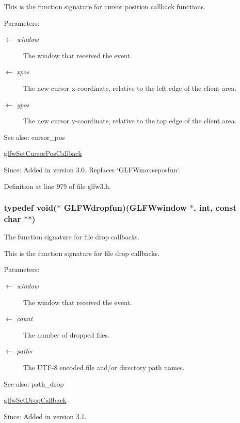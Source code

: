 This is the function signature for cursor position callback functions.

\begin{Desc}
\item[Parameters:]
\begin{description}
\item[\mbox{$\leftarrow$} {\em window}]The window that received the event. \item[\mbox{$\leftarrow$} {\em xpos}]The new cursor x-coordinate, relative to the left edge of the client area. \item[\mbox{$\leftarrow$} {\em ypos}]The new cursor y-coordinate, relative to the top edge of the client area.\end{description}
\end{Desc}
\begin{Desc}
\item[See also:]cursor\_\-pos 

\hyperlink{group__input_g9c49c0d3d3c775c3124726f1d902124d}{glfwSetCursorPosCallback}\end{Desc}
\begin{Desc}
\item[Since:]Added in version 3.0. Replaces `GLFWmouseposfun`. \end{Desc}


Definition at line 979 of file glfw3.h.\hypertarget{group__input_gcc95e259ad21d4f666faa6280d4018fd}{
\subsubsection[GLFWdropfun]{\setlength{\rightskip}{0pt plus 5cm}typedef void($\ast$  {\bf GLFWdropfun})({\bf GLFWwindow} $\ast$, int, const char $\ast$$\ast$)}}
\label{group__input_gcc95e259ad21d4f666faa6280d4018fd}


The function signature for file drop callbacks. 

This is the function signature for file drop callbacks.

\begin{Desc}
\item[Parameters:]
\begin{description}
\item[\mbox{$\leftarrow$} {\em window}]The window that received the event. \item[\mbox{$\leftarrow$} {\em count}]The number of dropped files. \item[\mbox{$\leftarrow$} {\em paths}]The UTF-8 encoded file and/or directory path names.\end{description}
\end{Desc}
\begin{Desc}
\item[See also:]path\_\-drop 

\hyperlink{group__input_gd4fc40df63a5d0441ab06de9a585cc04}{glfwSetDropCallback}\end{Desc}
\begin{Desc}
\item[Since:]Added in version 3.1. \end{Desc}


